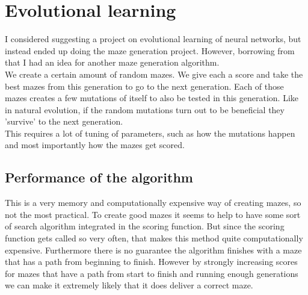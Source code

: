 \documentclass[10pt, a4paper, twoside]{amsart}
\newcommand{\1}{\mathbbm{1}}
\begin{document}
\section{Evolutional learning}
I considered suggesting a project on evolutional learning of neural networks, but instead ended up doing the maze generation project. However, borrowing from that I had an idea for another maze generation algorithm.\\
We create a certain amount of random mazes. We give each a score and take the best mazes from this generation to go to the next generation. Each of those mazes creates a few mutations of itself to also be tested in this generation. Like in natural evolution, if the random mutations turn out to be beneficial they 'survive' to the next generation.\\
This requires a lot of tuning of parameters, such as how the mutations happen and most importantly how the mazes get scored.

\subsection{Performance of the algorithm}
This is a very memory and computationally expensive way of creating mazes, so not the most practical. To create good mazes it seems to help to have some sort of search algorithm integrated in the scoring function. But since the scoring function gets called so very often, that makes this method quite computationally expensive.
Furthermore there is no guarantee the algorithm finishes with a maze that has a path from beginning to finish. However by strongly increasing scores for mazes that have a path from start to finish and running enough generations we can make it extremely likely that it does deliver a correct maze.
\end{document}
